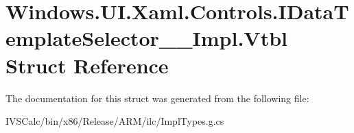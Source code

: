 \hypertarget{struct_windows_1_1_u_i_1_1_xaml_1_1_controls_1_1_i_data_template_selector_____impl_1_1_vtbl}{}\section{Windows.\+U\+I.\+Xaml.\+Controls.\+I\+Data\+Template\+Selector\+\_\+\+\_\+\+Impl.\+Vtbl Struct Reference}
\label{struct_windows_1_1_u_i_1_1_xaml_1_1_controls_1_1_i_data_template_selector_____impl_1_1_vtbl}


The documentation for this struct was generated from the following file\+:\begin{DoxyCompactItemize}
\item 
I\+V\+S\+Calc/bin/x86/\+Release/\+A\+R\+M/ilc/Impl\+Types.\+g.\+cs\end{DoxyCompactItemize}
